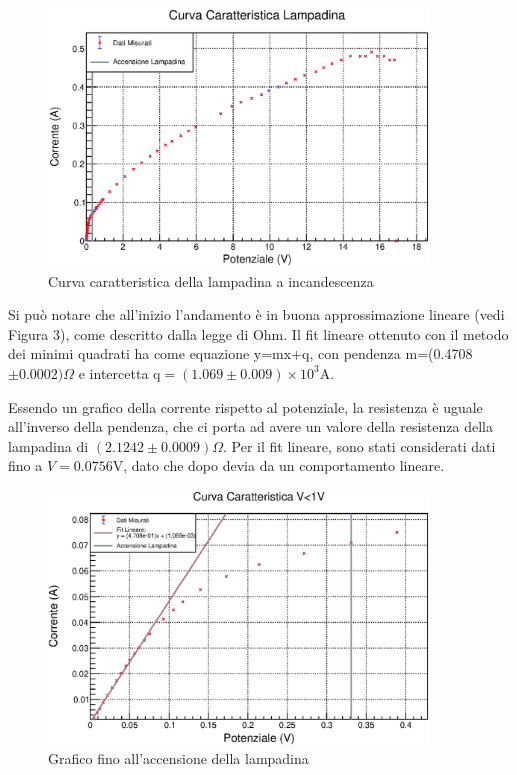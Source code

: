 \documentclass[a4paper]{article}
\begin{document}
\begin{figure}[!htbp] \label{fig2}
  \centering
      \includegraphics[width=0.9\textwidth]{immagini/bruciarelampa.eps}
        \caption{Curva caratteristica della lampadina a incandescenza}
\end{figure}
\FloatBarrier
Si può notare che all'inizio l'andamento è in buona approssimazione lineare (vedi Figura 3), come descritto dalla legge di Ohm. Il fit lineare ottenuto con il metodo dei minimi quadrati ha come equazione y=mx+q, con pendenza m=(0.4708$\pm 0.0002) \Omega$ e intercetta q$=(1.069\pm0.009)\times10^3$A.

Essendo un grafico della corrente rispetto al potenziale, la resistenza è uguale all'inverso della pendenza, che ci porta ad avere un valore della resistenza della lampadina di $(2.1242\pm 0.0009) \Omega$. Per il fit lineare, sono stati considerati dati fino a $V=0.0756$V, dato che dopo devia da un comportamento lineare. 

\begin{figure}[!htbp]\label{fig3}
  \centering
      \includegraphics[width=0.9\textwidth]{immagini/graficozoomato1.eps}
        \caption{Grafico fino all'accensione della lampadina}
\end{figure}
\FloatBarrier
{}
\end{document}
